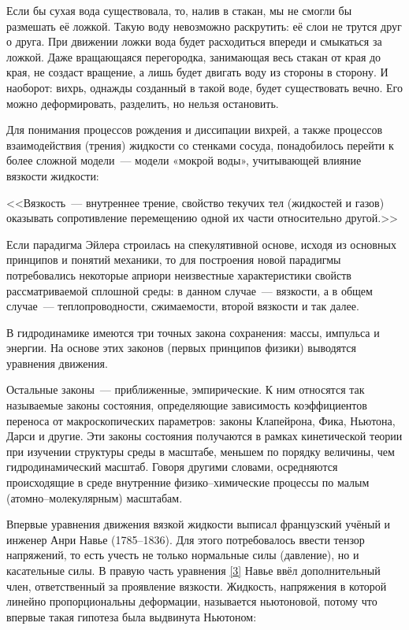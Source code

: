 Если бы сухая вода существовала, то, налив в стакан, мы не смогли бы размешать её ложкой. Такую воду невозможно 
раскрутить: её слои не трутся друг о друга. При движении ложки вода будет расходиться впереди и смыкаться за ложкой. 
Даже вращающаяся перегородка, занимающая весь стакан от края до края, не создаст вращение, а лишь будет 
двигать воду из стороны в сторону. И наоборот: вихрь, однажды созданный в такой воде, будет существовать вечно. 
Его можно деформировать, разделить, но нельзя остановить.

Для понимания процессов рождения и диссипации вихрей, а также процессов взаимодействия (трения) жидкости 
со стенками сосуда, понадобилось перейти к более сложной модели~--- модели «мокрой воды», учитывающей 
влияние вязкости жидкости:

<<Вязкость~--- внутреннее трение, свойство текучих тел (жидкостей и газов) оказывать сопротивление 
перемещению одной их части относительно другой.>>

Если парадигма Эйлера строилась на спекулятивной основе, исходя из основных принципов и понятий механики, 
то для построения новой парадигмы потребовались некоторые априори неизвестные характеристики свойств 
рассматриваемой сплошной среды: в данном случае~--- вязкости, а в общем случае~--- теплопроводности, 
сжимаемости, второй вязкости и так далее.

В гидродинамике имеются три точных закона сохранения: массы, импульса и энергии. На основе этих законов 
(первых принципов физики) выводятся уравнения движения.

Остальные законы~--- приближенные, эмпирические. К ним относятся так называемые законы состояния, 
определяющие зависимость коэффициентов переноса от макроскопических параметров: законы Клапейрона, Фика, 
Ньютона, Дарси и другие. Эти законы состояния получаются в рамках кинетической теории при изучении 
структуры среды в масштабе, меньшем по порядку величины, чем гидродинамический масштаб. Говоря другими словами, 
осредняются происходящие в среде внутренние физико--химические процессы по малым (атомно--молекулярным) масштабам.

Впервые уравнения движения вязкой жидкости выписал французский учёный и инженер Анри Навье (1785--1836). 
Для этого потребовалось ввести тензор напряжений, то есть учесть не только нормальные силы (давление), но 
и касательные силы. В правую часть уравнения \ref{3} Навье ввёл дополнительный член, ответственный за 
проявление вязкости. Жидкость, напряжения в которой линейно пропорциональны деформации, называется ньютоновой, 
потому что впервые такая гипотеза была выдвинута Ньютоном:

